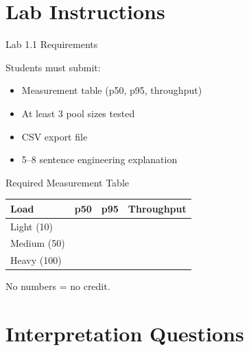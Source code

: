 \documentclass[11pt]{beamer}
\begin{document}
	\section{Lab Instructions}
	
	\begin{frame}{Lab 1.1 Requirements}
		
		Students must submit:
		
		\begin{itemize}
			\item Measurement table (p50, p95, throughput)
			\item At least 3 pool sizes tested
			\item CSV export file
			\item 5--8 sentence engineering explanation
		\end{itemize}
	\end{frame}
	
	\begin{frame}{Required Measurement Table}
		
		\begin{center}
			\begin{tabular}{lccc}
				Load & p50 & p95 & Throughput \\
				\hline
				Light (10) &  &  &  \\
				Medium (50) &  &  &  \\
				Heavy (100) &  &  &  \\
			\end{tabular}
		\end{center}

		
		\begin{alertblock}
			No numbers = no credit.
		\end{alertblock}
	\end{frame}
	
	\section{Interpretation Questions}
	
\end{document}
